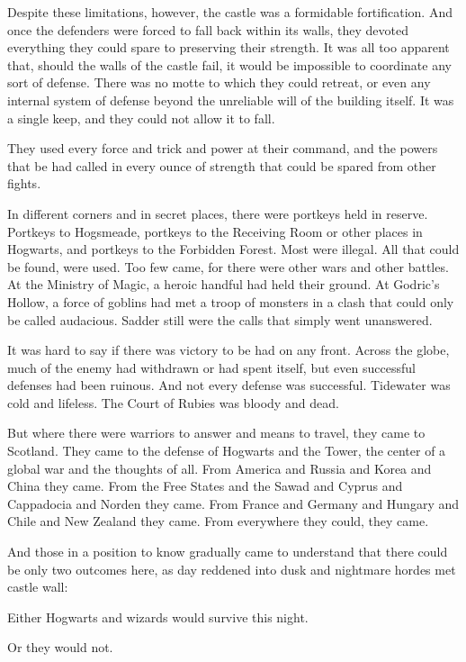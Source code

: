 Despite these limitations, however, the castle was a formidable
fortification. And once the defenders were forced to fall back within
its walls, they devoted everything they could spare to preserving their
strength. It was all too apparent that, should the walls of the castle
fail, it would be impossible to coordinate any sort of defense. There
was no motte to which they could retreat, or even any internal system of
defense beyond the unreliable will of the building itself. It was a
single keep, and they could not allow it to fall.

They used every force and trick and power at their command, and the
powers that be had called in every ounce of strength that could be
spared from other fights.

In different corners and in secret places, there were portkeys held in
reserve. Portkeys to Hogsmeade, portkeys to the Receiving Room or other
places in Hogwarts, and portkeys to the Forbidden Forest. Most were
illegal. All that could be found, were used. Too few came, for there
were other wars and other battles. At the Ministry of Magic, a heroic
handful had held their ground. At Godric's Hollow, a force of goblins
had met a troop of monsters in a clash that could only be called
audacious. Sadder still were the calls that simply went unanswered.

It was hard to say if there was victory to be had on any front. Across
the globe, much of the enemy had withdrawn or had spent itself, but even
successful defenses had been ruinous. And not every defense was
successful. Tidewater was cold and lifeless. The Court of Rubies was
bloody and dead.

But where there were warriors to answer and means to travel, they came
to Scotland. They came to the defense of Hogwarts and the Tower, the
center of a global war and the thoughts of all. From America and Russia
and Korea and China they came. From the Free States and the Sawad and
Cyprus and Cappadocia and Norden they came. From France and Germany and
Hungary and Chile and New Zealand they came. From everywhere they could,
they came.

And those in a position to know gradually came to understand that there
could be only two outcomes here, as day reddened into dusk and nightmare
hordes met castle wall:

Either Hogwarts and wizards would survive this night.

Or they would not.

\mybreak

